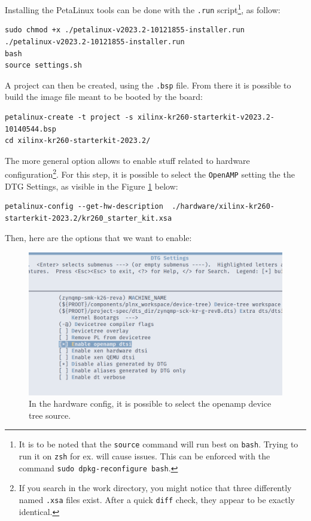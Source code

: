 \documentclass[10pt]{article}
\begin{document}
Installing the PetaLinux tools can be done with the \texttt{.run} script\footnote{It is to be noted that the \texttt{source} command will run best on \texttt{bash}. Trying
to run it on \texttt{zsh} for ex. will cause issues. This can be enforced with the
command \texttt{sudo dpkg-reconfigure bash}.}, as follow:
\begin{verbatim}
sudo chmod +x ./petalinux-v2023.2-10121855-installer.run
./petalinux-v2023.2-10121855-installer.run
bash
source settings.sh
\end{verbatim}

A project can then be created, using the \texttt{.bsp} file. From there it is possible to
build the image file meant to be booted by the board:
\begin{verbatim}
petalinux-create -t project -s xilinx-kr260-starterkit-v2023.2-10140544.bsp
cd xilinx-kr260-starterkit-2023.2/
\end{verbatim}


The more general option allows to enable stuff related to hardware
configuration\footnote{If you search in the work directory, you might notice that three
differently named \texttt{.xsa} files exist. After a quick \texttt{diff} check, they appear to be
exactly identical.}. For this step, it is possible to select the \texttt{OpenAMP}
setting the the DTG Settings, as visible in the Figure \ref{fig:orge6f393a} below:
\begin{verbatim}
petalinux-config --get-hw-description  ./hardware/xilinx-kr260-starterkit-2023.2/kr260_starter_kit.xsa
\end{verbatim}

Then, here are the options that we want to enable:
\begin{figure}[htbp]
\centering
\includegraphics[width=.6\textwidth]{./img/yocto_openamp_dtg.png}
\caption{\label{fig:orge6f393a}In the hardware config, it is possible to select the openamp device tree source.}
\end{figure}
\end{document}
